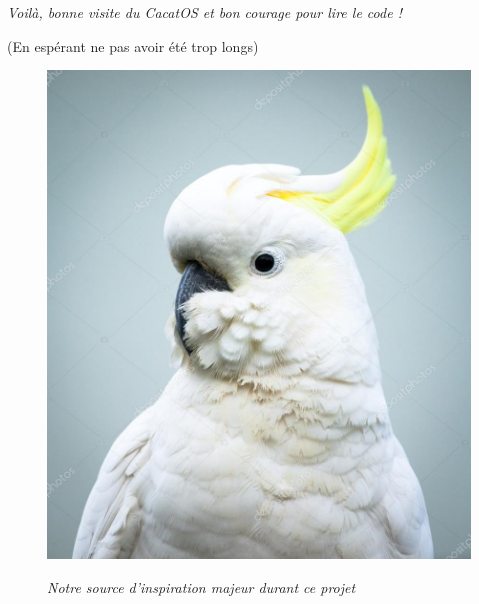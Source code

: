 \documentclass[a4paper,10pt, french]{article}
\begin{document}
\begin{center}
 \emph{Voilà, bonne visite du CacatOS et bon courage pour lire le code !}
 
 (En espérant ne pas avoir été trop longs)
\end{center}



\begin{figure}[h]
 \includegraphics[scale = 0.2]{cacatoes.jpg}
 \centering
 
 \emph{Notre source d'inspiration majeur durant ce projet}
\end{figure}
\end{document}
